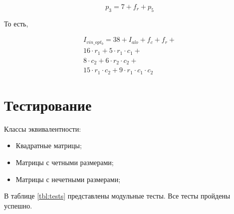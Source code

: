 \begin{enumerate}
    \begin{equation*}
        p_3 = 7 + f_r + p_5
    \end{equation*}

    То есть,

    \begin{eqnarray*}
        I_{vin\_opt_b} = 38 + I_{alo} + f_c + f_r + \\
        16 \cdot r_1 + 5 \cdot r_1 \cdot c_1 + \\
        8 \cdot c_2 + 6 \cdot r_2 \cdot c_2 + \\
        15 \cdot r_1 \cdot c_2 + 9 \cdot r_1 \cdot c_1 \cdot c_2
    \end{eqnarray*}
    
\end{enumerate}

\section{Тестирование}

Классы эквивалентности:

\begin{itemize}
    \item Квадратные матрицы;
    \item Матрицы с четными размерами;
    \item Матрицы с нечетными размерами;
\end{itemize}

В таблице \ref{tbl:tests} представлены модульные тесты.
Все тесты пройдены успешно.

